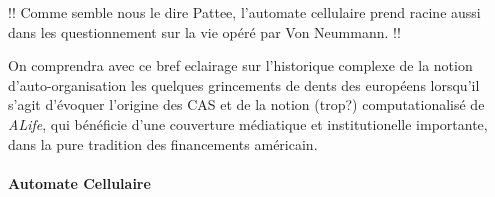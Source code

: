 

!! Comme semble nous le dire Pattee, l'automate cellulaire prend racine aussi dans les questionnement sur la vie opéré par Von Neummann. !!

On comprendra avec ce bref eclairage sur l'historique complexe de la notion d'auto-organisation les quelques grincements de dents des européens \autocite{Varela1995} lorsqu'il s'agit d'évoquer l'origine des CAS et de la notion (trop?) computationalisé de \textit{ALife}, qui bénéficie d'une couverture médiatique et institutionelle importante, dans la pure tradition des financements américain.  



\paragraph{Automate Cellulaire}
\label{p:va_automate_cellulaire}

